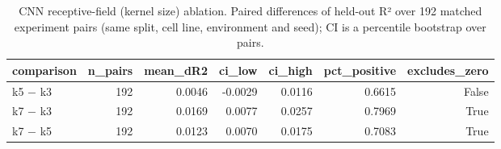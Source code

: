 \begin{table}[htbp]
\centering
\footnotesize
\caption{CNN receptive-field (kernel size) ablation. Paired differences of held-out R² over 192 matched experiment pairs (same split, cell line, environment and seed); CI is a percentile bootstrap over pairs.}
\label{tab:kernel}
\begin{tabular}{lrrrrrr}
\toprule
comparison & n\_pairs & mean\_dR2 & ci\_low & ci\_high & pct\_positive & excludes\_zero \\
\midrule
k5 $-$ k3 & 192 & 0.0046 & -0.0029 & 0.0116 & 0.6615 & False \\
k7 $-$ k3 & 192 & 0.0169 & 0.0077 & 0.0257 & 0.7969 & True \\
k7 $-$ k5 & 192 & 0.0123 & 0.0070 & 0.0175 & 0.7083 & True \\
\bottomrule
\end{tabular}
\end{table}
